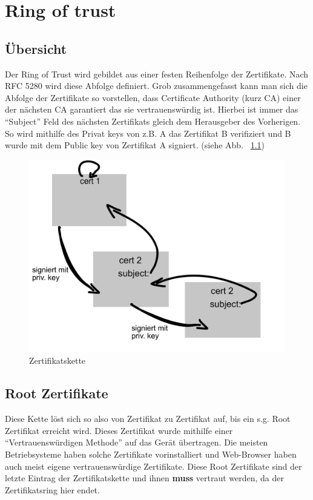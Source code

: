 \chapter{Ring of trust}
\section{Übersicht}

  Der Ring of Trust wird gebildet aus einer festen Reihenfolge der Zertifikate.
  Nach RFC 5280 wird diese Abfolge definiert. Grob zusammengefasst kann man sich
  die Abfolge der Zertifikate so vorstellen, dass Certificate Authority (kurz
  CA) einer der nächsten CA garantiert das sie vertrauenswürdig ist. Hierbei ist
  immer das ``Subject'' Feld des nächsten Zertifikats gleich dem Herausgeber des
  Vorherigen. So wird mithilfe des Privat keys von z.B. A das Zertifikat B
  verifiziert und B wurde mit dem Public key von Zertifikat A signiert. (siehe
  Abb. ~\ref{fig:certchain})\\

  \begin{figure}[!htb]
    \center \includegraphics[scale=0.28]{images/rot.png}
    \caption{Zertifikatskette}
    \label{fig:certchain}
  \end{figure}

  \section{Root Zertifikate}
  Diese Kette löst sich so also von Zertifikat zu Zertifikat auf, bis ein s.g.
  Root Zertifikat erreicht wird. Dieses Zertifikat wurde mithilfe einer
  ``Vertrauenswürdigen Methode'' auf das Gerät übertragen. Die meisten
  Betriebsysteme haben solche Zertifikate vorinstalliert und Web-Browser haben
  auch meist eigene vertrauenswürdige Zertifikate. Diese Root Zertifikate sind
  der letzte Eintrag der Zertifikatskette und ihnen \textbf{muss} vertraut
  werden, da der Zertifikatsring hier endet.
  \pagebreak

